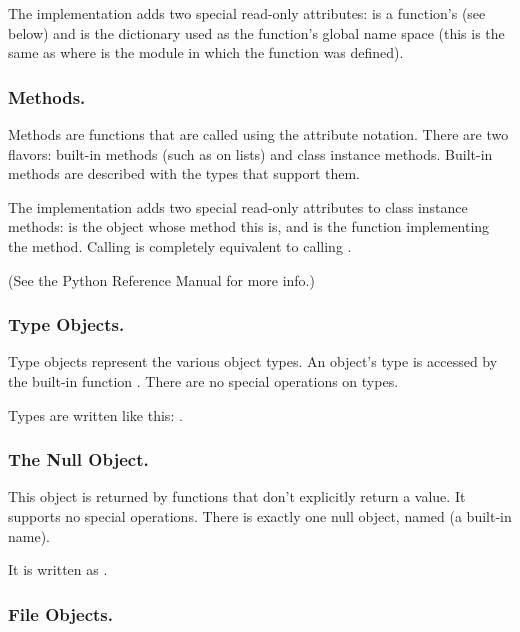 The implementation adds two special read-only attributes:
 is a function's  (see below) and
 is the dictionary used as the function's
global name space (this is the same as  where
 is the module in which the function  was defined).

\subsubsection{Methods.}

Methods are functions that are called using the attribute notation.
There are two flavors: built-in methods (such as  on
lists) and class instance methods.  Built-in methods are described
with the types that support them.

The implementation adds two special read-only attributes to class
instance methods:  is the object whose method this
is, and  is the function implementing the method.
Calling  is completely equivalent to calling
.

(See the Python Reference Manual for more info.)

\subsubsection{Type Objects.}

Type objects represent the various object types.  An object's type is
accessed by the built-in function .  There are no special
operations on types.

Types are written like this: .

\subsubsection{The Null Object.}

This object is returned by functions that don't explicitly return a
value.  It supports no special operations.  There is exactly one null
object, named  (a built-in name).

It is written as .

\subsubsection{File Objects.}

